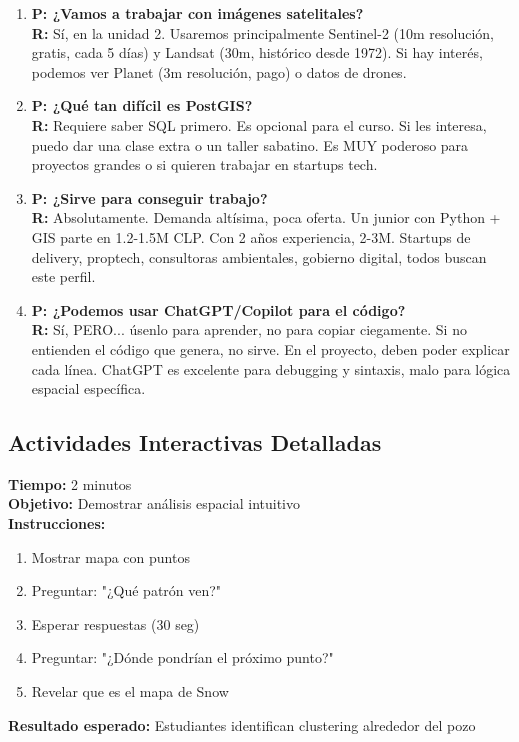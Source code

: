 \documentclass[11pt,a4paper]{article}
\begin{document}
\begin{enumerate}
\item \textbf{P: ¿Vamos a trabajar con imágenes satelitales?}\\
\textbf{R:} Sí, en la unidad 2. Usaremos principalmente Sentinel-2 (10m resolución, gratis, cada 5 días) y Landsat (30m, histórico desde 1972). Si hay interés, podemos ver Planet (3m resolución, pago) o datos de drones.

\item \textbf{P: ¿Qué tan difícil es PostGIS?}\\
\textbf{R:} Requiere saber SQL primero. Es opcional para el curso. Si les interesa, puedo dar una clase extra o un taller sabatino. Es MUY poderoso para proyectos grandes o si quieren trabajar en startups tech.

\item \textbf{P: ¿Sirve para conseguir trabajo?}\\
\textbf{R:} Absolutamente. Demanda altísima, poca oferta. Un junior con Python + GIS parte en 1.2-1.5M CLP. Con 2 años experiencia, 2-3M. Startups de delivery, proptech, consultoras ambientales, gobierno digital, todos buscan este perfil.

\item \textbf{P: ¿Podemos usar ChatGPT/Copilot para el código?}\\
\textbf{R:} Sí, PERO... úsenlo para aprender, no para copiar ciegamente. Si no entienden el código que genera, no sirve. En el proyecto, deben poder explicar cada línea. ChatGPT es excelente para debugging y sintaxis, malo para lógica espacial específica.
\end{enumerate}

\subsection{Actividades Interactivas Detalladas}

\begin{tcolorbox}[colback=blue!5,colframe=blue!50!black,title=Actividad 1: Encuentra el Patrón (Slide 4)]
\textbf{Tiempo:} 2 minutos\\
\textbf{Objetivo:} Demostrar análisis espacial intuitivo\\
\textbf{Instrucciones:}
\begin{enumerate}
    \item Mostrar mapa con puntos
    \item Preguntar: "¿Qué patrón ven?"
    \item Esperar respuestas (30 seg)
    \item Preguntar: "¿Dónde pondrían el próximo punto?"
    \item Revelar que es el mapa de Snow
\end{enumerate}
\textbf{Resultado esperado:} Estudiantes identifican clustering alrededor del pozo
\end{tcolorbox}
\end{document}
